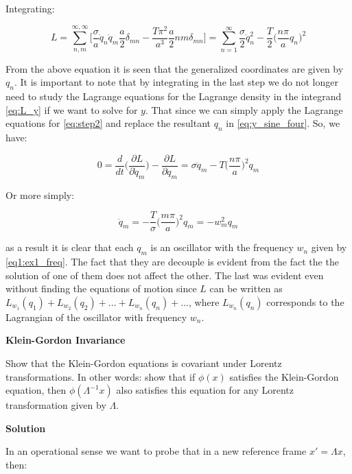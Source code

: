 Integrating:

\begin{equation}
L = \sum_{n, m}^{\infty, \infty}
\Bigg[ \frac{\sigma}{a} \dot{q}_n \dot{q}_m \frac{a}{2}\delta_{mn}  - \frac{T\pi^2}{a^3}\frac{a}{2}nm\delta_{mn} \Bigg] = \sum_{n=1}^{\infty} \frac{\sigma}{2} \dot{q}^2_n - \frac{T}{2} \bigg( \frac{n \pi }{a} q_n\bigg)^2
\label{eq:step2}
\end{equation}

From the above equation it is seen that the generalized coordinates are given by $q_n$. It is important to note that by integrating in the last step we do not longer need to study the Lagrange equations for the Lagrange density in the integrand \ref{eq:L_y} if we want to solve for $y$. That since we can simply apply the Lagrange equations for \ref{eq:step2} and replace the resultant $q_n$ in \ref{eq:y_sine_four}. So, we have:

\begin{equation}
0 = \frac{d}{dt} \bigg( \frac{\partial L}{\partial \dot{q}_m} \bigg) - \frac{\partial L}{\partial q_m} = \sigma \ddot{q}_m - T \bigg( \frac{n\pi}{a}\bigg)^2 q_m 
\end{equation}

Or more simply:


\begin{equation}
\ddot{q}_m = - \frac{T}{\sigma} \bigg( \frac{m\pi}{a}\bigg)^2 q_m = - w^2_m q_m
\end{equation}

as a result it is clear that each $q_m$ is an oscillator with the frequency $w_n$ given by \ref{eq1:ex1_freq}. The fact that they are decouple is evident from the fact the the solution of one of them does not affect the other. The last was evident even without finding the equations of motion since $L$ can be written as $L_{w_1}(q_1) + L_{w_2}(q_2) + ... + L_{w_n}(q_n) + ...$, where $L_{w_n}(q_n)$ corresponds to the Lagrangian of the oscillator with frequency $w_n$.


\item \textbf{Klein-Gordon Invariance}

Show that the Klein-Gordon equations is covariant under Lorentz transformations. In other words: show that if $\phi(x)$ satisfies the Klein-Gordon equation, then $\phi(\Lambda^{-1}x)$ also satisfies this equation for any Lorentz transformation given by $\Lambda$.

\textbf{Solution}

In an operational sense we want to probe that in a new reference frame $x' = \Lambda x$, then:


